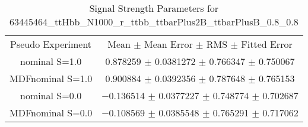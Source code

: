 \begin{table}
\centering
\caption{Signal Strength Parameters for 63445464\_ttHbb\_N1000\_r\_ttbb\_ttbarPlus2B\_ttbarPlusB\_0.8\_0.8}
\begin{tabular}{cc}
\toprule
Pseudo Experiment & Mean $\pm$ Mean Error $\pm$ RMS $\pm$ Fitted Error\\
nominal S=1.0 & \num{0.878259} $\pm$ \num{0.0381272} $\pm$ \num{0.766347} $\pm$ \num{0.750067}\\
MDFnominal S=1.0 & \num{0.900884} $\pm$ \num{0.0392356} $\pm$ \num{0.787648} $\pm$ \num{0.765153}\\
nominal S=0.0 & \num{-0.136514} $\pm$ \num{0.0377227} $\pm$ \num{0.748774} $\pm$ \num{0.702687}\\
MDFnominal S=0.0 & \num{-0.108569} $\pm$ \num{0.0385548} $\pm$ \num{0.765291} $\pm$ \num{0.717062}\\
\bottomrule
\end{tabular}
\end{table}